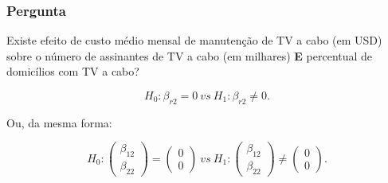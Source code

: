 \documentclass[10pt,
  aspectratio=169,
  serif,
  mathserif,
  professionalfont,
  compress,
  handout,
  ]{beamer}\usepackage[]{graphicx}\usepackage[]{color}
\begin{document}

\begin{frame}

\frametitle{Pergunta}

Existe efeito de custo médio mensal de manutenção de TV a cabo (em USD) sobre o número de assinantes de TV a cabo (em milhares) \textbf{E} percentual de domicílios com TV a cabo?

$$H_0: \beta_{r2} = 0 \ vs \ H_1: \beta_{r2} \neq 0.$$ 

Ou, da mesma forma:

$$H_0: 
\begin{pmatrix}
\beta_{12} \\ 
\beta_{22}
\end{pmatrix} 
= 
\begin{pmatrix}
0 \\ 
0
\end{pmatrix}
\ vs \ 
H_1: 
\begin{pmatrix}
\beta_{12} \\ 
\beta_{22}
\end{pmatrix} 
\neq
\begin{pmatrix}
0 \\ 
0 
\end{pmatrix}.$$

\end{frame}

\end{document}
